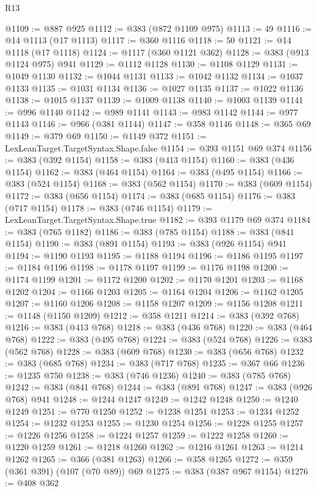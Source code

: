 \begin{lexlean}{R13}
\begin{coremodule}
{{{{{{{{{{{{{{{{{{{{{{{{{{{{{{{{{{{{{{{{{{{{{{{{{{{{{{@1109 := @887 @925
@1112 := @383 (@872 @1109 @975)
@1113 := 49
@1116 := @14 @1113 (@17 @1113)
@1117 := @360 @1116
@1118 := 50
@1121 := @14 @1118 (@17 @1118)
@1124 := @1117 (@360 @1121 @362)
@1128 := @383 (@913 @1124 @975) @941
@1129 := @1112 @1128
@1130 := @1108 @1129
@1131 := @1049 @1130
@1132 := @1044 @1131
@1133 := @1042 @1132
@1134 := @1037 @1133
@1135 := @1031 @1134
@1136 := @1027 @1135
@1137 := @1022 @1136
@1138 := @1015 @1137
@1139 := @1009 @1138
@1140 := @1003 @1139
@1141 := @996 @1140
@1142 := @989 @1141
@1143 := @983 @1142
@1144 := @977 @1143
@1146 := @966 (@381 @1144)
@1147 := @358 @1146
@1148 := @365 @69
@1149 := @379 @69
@1150 := @1149 @372
@1151 := LexLeanTarget.TargetSyntax.Shape.false
@1154 := @393 @1151 @69 @374
@1156 := @383 (@392 @1154)
@1158 := @383 (@413 @1154)
@1160 := @383 (@436 @1154)
@1162 := @383 (@464 @1154)
@1164 := @383 (@495 @1154)
@1166 := @383 (@524 @1154)
@1168 := @383 (@562 @1154)
@1170 := @383 (@609 @1154)
@1172 := @383 (@656 @1154)
@1174 := @383 (@685 @1154)
@1176 := @383 (@717 @1154)
@1178 := @383 (@746 @1154)
@1179 := LexLeanTarget.TargetSyntax.Shape.true
@1182 := @393 @1179 @69 @374
@1184 := @383 (@765 @1182)
@1186 := @383 (@785 @1154)
@1188 := @383 (@841 @1154)
@1190 := @383 (@891 @1154)
@1193 := @383 (@926 @1154) @941
@1194 := @1190 @1193
@1195 := @1188 @1194
@1196 := @1186 @1195
@1197 := @1184 @1196
@1198 := @1178 @1197
@1199 := @1176 @1198
@1200 := @1174 @1199
@1201 := @1172 @1200
@1202 := @1170 @1201
@1203 := @1168 @1202
@1204 := @1166 @1203
@1205 := @1164 @1204
@1206 := @1162 @1205
@1207 := @1160 @1206
@1208 := @1158 @1207
@1209 := @1156 @1208
@1211 := @1148 (@1150 @1209)
@1212 := @358 @1211
@1214 := @383 (@392 @768)
@1216 := @383 (@413 @768)
@1218 := @383 (@436 @768)
@1220 := @383 (@464 @768)
@1222 := @383 (@495 @768)
@1224 := @383 (@524 @768)
@1226 := @383 (@562 @768)
@1228 := @383 (@609 @768)
@1230 := @383 (@656 @768)
@1232 := @383 (@685 @768)
@1234 := @383 (@717 @768)
@1235 := @367 @66
@1236 := @1235 @750
@1238 := @383 (@746 @1236)
@1240 := @383 (@785 @768)
@1242 := @383 (@841 @768)
@1244 := @383 (@891 @768)
@1247 := @383 (@926 @768) @941
@1248 := @1244 @1247
@1249 := @1242 @1248
@1250 := @1240 @1249
@1251 := @770 @1250
@1252 := @1238 @1251
@1253 := @1234 @1252
@1254 := @1232 @1253
@1255 := @1230 @1254
@1256 := @1228 @1255
@1257 := @1226 @1256
@1258 := @1224 @1257
@1259 := @1222 @1258
@1260 := @1220 @1259
@1261 := @1218 @1260
@1262 := @1216 @1261
@1263 := @1214 @1262
@1265 := @366 (@381 @1263)
@1266 := @358 @1265
@1272 := @359 (@361 @391) (@107 (@70 @89)) @69
@1275 := @383 (@387 @967 @1154)
@1276 := @408 @362
}}}}}}}}}}}}}}}}}}}}}}}}}}}}}}}}}}}}}}}}}}}}}}}}}}}}}}
\end{coremodule}
\end{lexlean}
